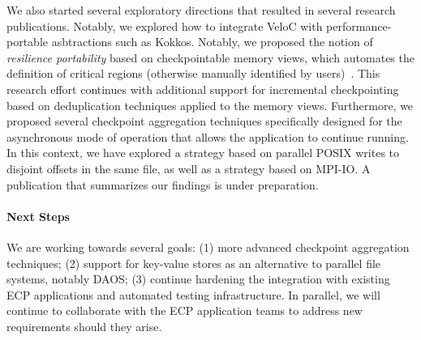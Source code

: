We also started several exploratory directions that resulted in
several research publications. Notably, we explored how to integrate
VeloC with performance-portable asbtractions such as Kokkos. Notably,
we proposed the notion of \emph{resilience portability} based on
checkpointable memory views, which automates the definition of
critical regions (otherwise manually identified by
users)~\cite{PortResEuroPar21}. This research effort continues with
additional support for incremental checkpointing based on
deduplication techniques applied to the memory views. Furthermore, we
proposed several checkpoint aggregation techniques specifically
designed for the asynchronous mode of operation that allows the
application to continue running. In this context, we have explored a
strategy based on parallel POSIX writes to disjoint offsets in the
same file, as well as a strategy based on MPI-IO. A publication that
summarizes our findings is under preparation.

\paragraph{Next Steps}
We are working towards several goals: (1) more advanced checkpoint
aggregation techniques; (2) support for key-value stores as an
alternative to parallel file systems, notably DAOS; (3) continue
hardening the integration with existing ECP applications and automated
testing infrastructure.  In parallel, we will continue to collaborate
with the ECP application teams to address new requirements should they
arise.
